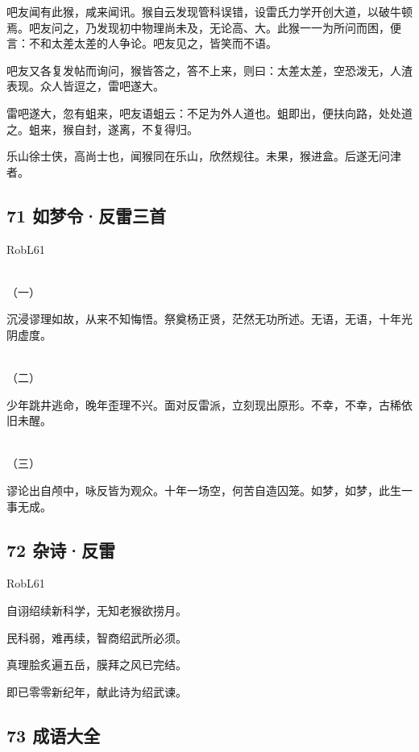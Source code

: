 吧友闻有此猴，咸来闻讯。猴自云发现管科误错，设雷氏力学开创大道，以破牛顿焉。吧友问之，乃发现初中物理尚未及，无论高、大。此猴一一为所问而困，便言：不和太差太差的人争论。吧友见之，皆笑而不语。

吧友又各复发帖而询问，猴皆答之，答不上来，则曰：太差太差，空恐泼无，人渣表现。众人皆逗之，雷吧遂大。

雷吧遂大，忽有蛆来，吧友语蛆云：不足为外人道也。蛆即出，便扶向路，处处道之。蛆来，猴自封，遂离，不复得归。

乐山徐士侠，高尚士也，闻猴同在乐山，欣然规往。未果，猴进盒。后遂无问津者。

\hypertarget{ux5982ux68a6ux4ee4ux53cdux96f7ux4e09ux9996}{%
\subsection{71
如梦令·反雷三首}\label{ux5982ux68a6ux4ee4ux53cdux96f7ux4e09ux9996}}

RobL61

~\\
（一）

沉浸谬理如故，从来不知悔悟。祭奠杨正贤，茫然无功所述。无语，无语，十年光阴虚度。

~\\
（二）

少年跳井逃命，晚年歪理不兴。面对反雷派，立刻现出原形。不幸，不幸，古稀依旧未醒。

~\\
（三）

谬论出自颅中，咏反皆为观众。十年一场空，何苦自造囚笼。如梦，如梦，此生一事无成。

\hypertarget{ux6742ux8bd7ux53cdux96f7}{%
\subsection{72 杂诗·反雷}\label{ux6742ux8bd7ux53cdux96f7}}

RobL61

自诩绍续新科学，无知老猴欲捞月。

民科弱，难再续，智商绍武所必须。

真理脍炙遍五岳，膜拜之风已完结。

即已零零新纪年，献此诗为绍武谏。

\hypertarget{ux6210ux8bedux5927ux5168}{%
\subsection{73 成语大全}\label{ux6210ux8bedux5927ux5168}}

